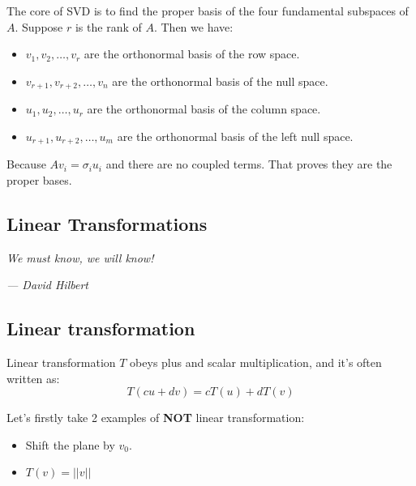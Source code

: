 \documentclass[12pt]{ctexart}
\begin{document}
The core of SVD is to find the proper basis of the four fundamental subspaces of $A$. Suppose
$r$ is the rank of $A$. Then we have:
\begin{itemize}
  \item $v_1, v_2, \ldots, v_r$ are the orthonormal basis of the row space.
  \item $v_{r+1}, v_{r+2}, \ldots, v_n$ are the orthonormal basis of the null space.
  \item $u_1, u_2, \ldots, u_r$ are the orthonormal basis of the column space.
  \item $u_{r+1}, u_{r+2}, \ldots, u_m$ are the orthonormal basis of the left null space.
\end{itemize}

Because $Av_i = \sigma_i u_i$ and there are no coupled terms. That proves they are the
proper bases.

\newpage
\thispagestyle{empty}
\begin{center}
    \vspace*{96pt}
    \fontsize{60}{60}\par
    \fontsize{26}{31.2}\section{\textbf{Linear Transformations}}\par %
    \vspace{25pt}
    \begin{center}
      \fontsize{18}{21.6}\customfont\textit{We must know, we will know!}
    \end{center}
    \begin{flushright}
      \fontsize{18}{21.6}\customfont\textit{--- David Hilbert}
    \end{flushright}
    \vfill
\end{center}

\newpage
\subsection{\textbf{Linear transformation}}

Linear transformation $T$ obeys plus and scalar multiplication, and it's often written as:
\[
  T(cu + dv) = cT(u) + dT(v)
\]

Let's firstly take 2 examples of \textbf{NOT} linear transformation:
\begin{itemize}
  \item Shift the plane by $v_0$.
  \item $T(v) = ||v||$
\end{itemize}
\end{document}
